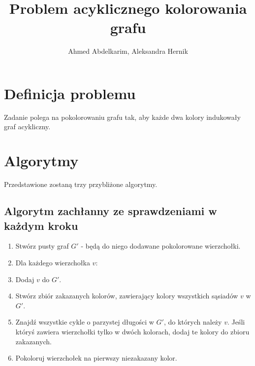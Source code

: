 \documentclass{article}
\title{Problem acyklicznego kolorowania grafu}
\author{Ahmed Abdelkarim, Aleksandra Hernik}
\begin{document}
\maketitle
\section{Definicja problemu}
Zadanie polega na pokolorowaniu grafu tak, aby każde dwa kolory indukowały graf acykliczny. 
\section{Algorytmy}
Przedstawione zostaną trzy przybliżone algorytmy.
\subsection{Algorytm zachłanny ze sprawdzeniami w każdym kroku}
\begin{enumerate}
\item Stwórz pusty graf $G'$ - będą do niego dodawane pokolorowane wierzchołki.
\item Dla każdego wierzchołka $v$:
\item Dodaj $v$ do $G'$.
\item Stwórz zbiór zakazanych kolorów, zawierający kolory wszystkich sąsiadów $v$ w $G'$.
\item Znajdź wszystkie cykle o parzystej długości w $G'$, do których należy $v$. Jeśli któryś zawiera wierzchołki tylko w dwóch kolorach, dodaj te kolory do zbioru zakazanych.
\item Pokoloruj wierzchołek na pierwszy niezakazany kolor.
  
\end{enumerate}
\end{document}
